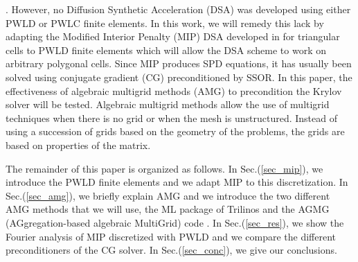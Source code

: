 \cite{pwl_diffusion}. However, no Diffusion Synthetic Acceleration (DSA) 
\cite{dsa_ref,larsen_dsa,consistent_p1,mip} was developed using either PWLD or
PWLC finite elements. In this work, we will remedy this lack by adapting the 
Modified Interior Penalty (MIP) DSA developed in \cite{mip} for triangular 
cells to PWLD finite elements which will allow the DSA scheme to work on arbitrary 
polygonal cells. Since MIP produces SPD equations, it has usually 
been solved using conjugate gradient (CG) preconditioned by SSOR. In this
paper, the effectiveness of algebraic multigrid methods (AMG) to precondition 
the Krylov solver \cite{amg,amg_course} will be tested. Algebraic multigrid methods 
allow the use of multigrid techniques when there is no grid or when the mesh is 
unstructured. Instead of using a succession of grids based on the geometry of the 
problems, the grids are based on properties of the matrix.

The remainder of this paper is organized as follows. In Sec.(\ref{sec_mip}),
we introduce the PWLD finite elements and we adapt MIP to this discretization. 
In Sec.(\ref{sec_amg}), we briefly explain AMG and we introduce the two different 
AMG methods that we will use, the ML package of Trilinos \cite{ml_guide} and the 
AGMG (AGgregation-based algebraic MultiGrid) code \cite{agmg_guide}. In 
Sec.(\ref{sec_res}), we show the Fourier analysis of MIP discretized with PWLD
and we compare the different preconditioners of the CG solver. In 
Sec.(\ref{sec_conc}), we give our conclusions.
